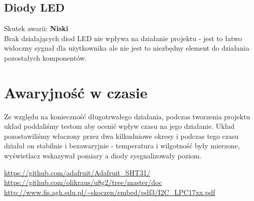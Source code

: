 \documentclass{classrep}
\begin{document}
\subsection {Diody LED}
Skutek awarii: \textbf{Niski}\\
Brak działających diod LED nie wpływa na działanie projektu - jest to łatwo widoczny sygnał dla użytkownika ale nie jest to niezbędny element do działania pozostałych komponentów.

\section{Awaryjność w czasie}
Ze względu na konieczność długotrwałego działania, podczas tworzenia projektu układ poddaliśmy testom aby ocenić wpływ czasu na jego działanie. Układ pozostawiliśmy właczony przez dwa kilkudniowe okresy i podczas tego czasu działał on stabilnie i bezawaryjnie - temperatura i wilgotność były mierzone, wyświetlacz wskazywał pomiary a diody sysgnalizowały poziom.

\begin{thebibliography}{0}
\end{thebibliography}
\url{https://github.com/adafruit/Adafruit_SHT31/}\\
\url{https://github.com/olikraus/u8g2/tree/master/doc}\\
\url{http://www.fis.agh.edu.pl/~skoczen/embed/pdf3/I2C_LPC17xx.pdf}\\
\end{document}

